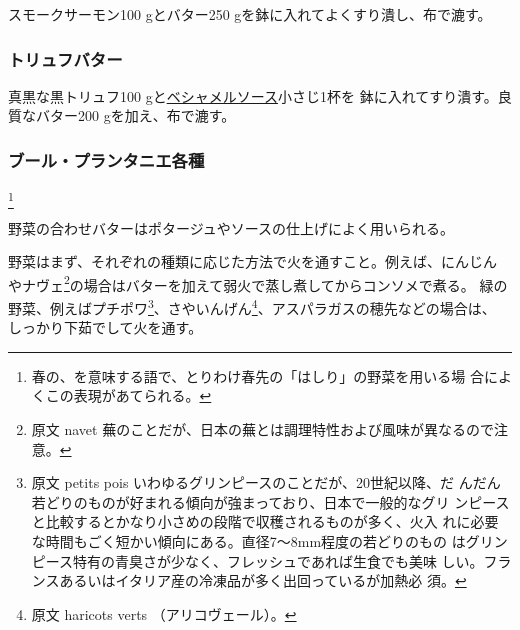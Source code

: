 \begin{recette}
スモークサーモン100 gとバター250 gを鉢に入れてよくすり潰し、布で漉す。

\maeaki

\hypertarget{beurre-de-truffe}{%
\subsubsection{トリュフバター}\label{beurre-de-truffe}}



真黒な黒トリュフ100
gと\protect\hyperlink{sauce-bechamel}{ベシャメルソース}小さじ1杯を
鉢に入れてすり潰す。良質なバター200 gを加え、布で漉す。

\maeaki

\hypertarget{beurres-printaniers}{%
\subsubsection{ブール・プランタニエ各種}\label{beurres-printaniers}}

\footnote{春の、を意味する語で、とりわけ春先の「はしり」の野菜を用いる場
  合によくこの表現があてられる。}


野菜の合わせバターはポタージュやソースの仕上げによく用いられる。

野菜はまず、それぞれの種類に応じた方法で火を通すこと。例えば、にんじん
やナヴェ\footnote{原文 navet
  蕪のことだが、日本の蕪とは調理特性および風味が異なるので注意。}の場合はバターを加えて弱火で蒸し煮してからコンソメで煮る。
緑の野菜、例えばプチポワ\footnote{原文 petits pois
  いわゆるグリンピースのことだが、20世紀以降、だ
  んだん若どりのものが好まれる傾向が強まっており、日本で一般的なグリ
  ンピースと比較するとかなり小さめの段階で収穫されるものが多く、火入
  れに必要な時間もごく短かい傾向にある。直径7〜8mm程度の若どりのもの
  はグリンピース特有の青臭さが少なく、フレッシュであれば生食でも美味
  しい。フランスあるいはイタリア産の冷凍品が多く出回っているが加熱必
  須。}、さやいんげん\footnote{原文 haricots verts （アリコヴェール）。}、アスパラガスの穂先などの場合は、
しっかり下茹でして火を通す。


\end{recette}
